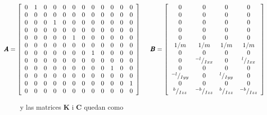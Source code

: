 \documentclass[twoside,11pt]{report}
\begin{document}
\begin{equation}
\hspace*{-0.9cm}\pmb{A}=\left[ \begin{array}{cccccccccccc}
0 & 1 & 0 & 0 & 0 & 0 & 0 & 0 & 0 & 0 & 0 & 0 \\
0 & 0 & 0 & 0 & 0 & 0 & 0 & 0 & 0 & 0 & 0 & 0 \\
0 & 0 & 0 & 1 & 0 & 0 & 0 & 0 & 0 & 0 & 0 & 0 \\
0 & 0 & 0 & 0 & 0 & 0 & 0 & 0 & 0 & 0 & 0 & 0 \\
0 & 0 & 0 & 0 & 0 & 1 & 0 & 0 & 0 & 0 & 0 & 0 \\
0 & 0 & 0 & 0 & 0 & 0 & 0 & 0 & 0 & 0 & 0 & 0 \\
0 & 0 & 0 & 0 & 0 & 0 & 0 & 1 & 0 & 0 & 0 & 0 \\
0 & 0 & 0 & 0 & 0 & 0 & 0 & 0 & 0 & 0 & 0 & 0 \\
0 & 0 & 0 & 0 & 0 & 0 & 0 & 0 & 0 & 1 & 0 & 0 \\
0 & 0 & 0 & 0 & 0 & 0 & 0 & 0 & 0 & 0 & 0 & 0 \\
0 & 0 & 0 & 0 & 0 & 0 & 0 & 0 & 0 & 0 & 0 & 1 \\
0 & 0 & 0 & 0 & 0 & 0 & 0 & 0 & 0 & 0 & 0 & 0 \\ \end{array} \right] \hspace*{0.5cm} \pmb{B} = \left[ \begin{array}{cccc}
0 & 0 & 0 & 0 \\
0 & 0 & 0 & 0 \\
0 & 0 & 0 & 0 \\
0 & 0 & 0 & 0 \\
0 & 0 & 0 & 0 \\
1/m & 1/m & 1/m & 1/m \\ 
0 & 0 & 0 & 0 \\
0 & {}^{-l}/_{Ixx} & 0 & {}^{l}/_{Ixx} \\ 
0 & 0 & 0 & 0 \\
{}^{-l}/_{Iyy} & 0 & {}^{l}/_{Iyy} & 0 \\
0 & 0 & 0 & 0 \\
{}^{b}/_{Izz} & {}^{-b}/_{Izz} & {}^{b}/_{Izz} & {}^{-b}/_{Izz} \\ \end{array} \right]
\end{equation}

y las matrices $\pmb{K}$ i $\pmb{C}$ quedan como 
\end{document}
